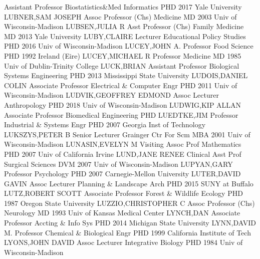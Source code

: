 \documentclass[
]{article}
\begin{document}
\textbar Assistant Professor \textbar Biostatistics\&Med Informatics
\textbar PHD 2017 Yale University \textbar LUBNER,SAM JOSEPH \textbar{}
 \textbar Assoc Professor (Chs) \textbar Medicine
\textbar MD 2003 Univ of Wisconsin-Madison \textbar LUBSEN,JULIA R
\textbar{}  \textbar Asst Professor (Chs) \textbar Family
Medicine \textbar MD 2013 Yale University \textbar LUBY,CLAIRE
\textbar{}  \textbar Lecturer \textbar Educational Policy
Studies \textbar PHD 2016 Univ of Wisconsin-Madison \textbar LUCEY,JOHN
A. \textbar{}  \textbar Professor \textbar Food Science
\textbar PHD 1992 Ireland (Eire) \textbar LUCEY,MICHAEL R \textbar{}
 \textbar Professor \textbar Medicine \textbar MD 1985 Univ
of Dublin-Trinity College \textbar LUCK,BRIAN \textbar{} 
\textbar Assistant Professor \textbar Biological Systems Engineering
\textbar PHD 2013 Mississippi State University \textbar LUDOIS,DANIEL
COLIN \textbar{}  \textbar Associate Professor
\textbar Electrical \& Computer Engr \textbar PHD 2011 Univ of
Wisconsin-Madison \textbar LUDVIK,GEOFFREY EDMOND \textbar{}
 \textbar Assoc Lecturer \textbar Anthropology \textbar PHD
2018 Univ of Wisconsin-Madison \textbar LUDWIG,KIP ALLAN \textbar{}
 \textbar Associate Professor \textbar Biomedical
Engineering \textbar PHD \textbar LUEDTKE,JIM \textbar{} 
\textbar Professor \textbar Industrial \& Systems Engr \textbar PHD 2007
Georgia Inst of Technology \textbar LUKSZYS,PETER B \textbar{}
 \textbar Senior Lecturer \textbar Grainger Ctr For Scm
\textbar MBA 2001 Univ of Wisconsin-Madison \textbar LUNASIN,EVELYN M
\textbar{}  \textbar Visiting Assoc Prof
\textbar Mathematics \textbar PHD 2007 Univ of California Irvine
\textbar LUND,JANE RENEE \textbar{}  \textbar Clinical Asst
Prof \textbar Surgical Sciences \textbar DVM 2007 Univ of
Wisconsin-Madison \textbar LUPYAN,GARY \textbar{} 
\textbar Professor \textbar Psychology \textbar PHD 2007 Carnegie-Mellon
University \textbar LUTER,DAVID GAVIN \textbar{} 
\textbar Assoc Lecturer \textbar Planning \& Landscape Arch \textbar PHD
2015 SUNY at Buffalo \textbar LUTZ,ROBERT SCOTT \textbar{} 
\textbar Associate Professor \textbar Forest \& Wildlife Ecology
\textbar PHD 1987 Oregon State University \textbar LUZZIO,CHRISTOPHER C
\textbar{}  \textbar Assoc Professor (Chs)
\textbar Neurology \textbar MD 1993 Univ of Kansas Medical Center
\textbar LYNCH,DAN \textbar{}  \textbar Associate Professor
\textbar Accting \& Info Sys \textbar PHD 2014 Michigan State University
\textbar LYNN,DAVID M. \textbar{}  \textbar Professor
\textbar Chemical \& Biological Engr \textbar PHD 1999 California
Institute of Tech \textbar LYONS,JOHN DAVID \textbar{} 
\textbar Assoc Lecturer \textbar Integrative Biology \textbar PHD 1984
Univ of Wisconsin-Madison \textbar{}
\end{document}
